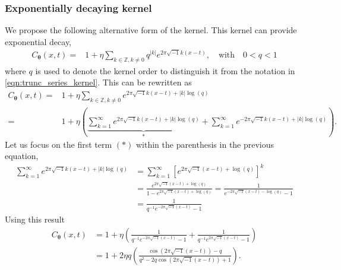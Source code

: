 \documentclass{svjour3}                     %
\newcommand{\bm}[1]{\boldsymbol{#1}}
\newcommand{\vtheta}{{\bm{\theta}}}
\def\abs#1{\ensuremath{\left \lvert #1 \right \rvert}}
\begin{document}
\subsubsection{Exponentially decaying kernel}
\label{sec:exp_decay_kernel}
We propose the following alternative form of the kernel. This kernel can provide exponential decay,
\begin{align*}
C_\vtheta(x, t) = & 1 + \eta \sum_{k \in \mathbb{Z}, k \neq 0 } q^{\abs{k}}  
e^{ 2 \pi\sqrt{-1} k (x-t)}, \quad \text{with} \quad 0 < q < 1
\end{align*}
where $q$ is used to denote the kernel order to distinguish it from the notation in \eqref{eqn:trunc_series_kernel}. This can be rewritten as
\begin{align*}
C_\vtheta(x, t) = & 1 + \eta \sum_{k \in \mathbb{Z}, k \neq 0 } 
e^{ 2 \pi\sqrt{-1} k (x-t) + \abs{k} \log(q)}
\\
=& 1 + \eta 
\left(
\underbrace{
	\sum_{k=1}^\infty e^{ 2 \pi\sqrt{-1} k (x-t) + \abs{k} \log(q)} }_{*}
+
\sum_{k=1}^{\infty} e^{ -2 \pi\sqrt{-1} k (x-t) + \abs{k} \log(q)}
\right).
\end{align*}
Let us focus on the first term $(*)$ within the parenthesis in the previous equation,
\begin{align*}
\sum_{k=1}^\infty e^{ 2 \pi\sqrt{-1} k (x-t) + \abs{k} \log(q)} & =
\sum_{k=1}^\infty \left[e^{ 2 \pi\sqrt{-1} (x-t) +  \log(q)} \right]^k
\\
& = \frac{e^{ 2 \pi\sqrt{-1} (x-t) +  \log(q)}}{1- e^{ 2 \pi\sqrt{-1} (x-t) +  \log(q)}}
= \frac{1}{ e^{- 2 \pi\sqrt{-1} (x-t) -  \log(q)} -1 }
\\
& =\frac{1}{ q^{-1} e^{- 2 \pi\sqrt{-1} (x-t)} -1 }
\end{align*}
Using this result
\begin{align*}
C_\vtheta(x, t) &= 
1 + \eta 
\left(
\frac{1}{ q^{-1} e^{- 2 \pi\sqrt{-1} (x-t)} -1 }
+
\frac{1}{ q^{-1} e^{ 2 \pi\sqrt{-1} (x-t)} -1 }
\right)
\\
&= 
1 + 2 \eta q
\left(
\frac{ \cos({2 \pi\sqrt{-1} (x-t) }) - q }
{q^{2} - 2 q \cos({ 2 \pi\sqrt{-1} (x-t)})  + 1 }
\right).
\end{align*}
\end{document}

